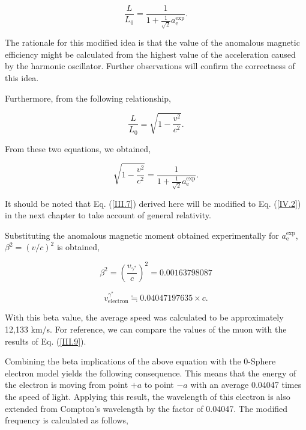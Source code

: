\documentclass[10.5pt]{article}
\numberwithin{equation}{section}
\begin{document}
    \begin{equation}
        \frac{L}{L_0} = \frac{1}{1 + \frac{1}{\sqrt{2}}a^{\text{exp}}_{\text{e}}} .
        \label{III.5}
    \end{equation}


The rationale for this modified idea is that the value of the anomalous magnetic efficiency might be calculated from the highest value of the acceleration caused by the harmonic oscillator. Further observations will confirm the correctness of this idea.

Furthermore, from the following relationship,

    \begin{equation}
        \frac{L}{L_0} = \sqrt{1 - \frac{v^2}{c^2}} .
    \end{equation}

From these two equations, we obtained,

    \begin{equation}
        \sqrt{1 - \frac{v^2}{c^2}} = \frac{1}{1 + \frac{1}{\sqrt{2}} a^{\text{exp}}_{\text{e}}}  .
        \label{III.7}
    \end{equation}


It should be noted that Eq. (\ref{III.7}) derived here will be modified to Eq. (\ref{IV.2}) in the next chapter to take account of general relativity.


Substituting the anomalous magnetic moment obtained experimentally for $a^{\text{exp}}_{\text{e}}$, $\beta^2 = (v/{c})^2$ is obtained,


    \begin{equation}
        \beta^2 = (\frac{v_{\gamma^{*}}}{c})^2 = 0.00163798087
    \end{equation}

    \begin{equation}
        v_{\text{electron}}^{\gamma^{*}} \fallingdotseq 0.04047197635 \times c .
        \label{III.9}
    \end{equation}


With this beta value, the average speed was calculated to be approximately 12,133 km/s. For reference, we can compare the values of the muon with the results of Eq. (\ref{III.9}). 

Combining the beta implications of the above equation with the 0-Sphere electron model yields the following consequence. This means that the energy of the electron is moving from point $+a$ to point $-a$ with an average 0.04047 times the speed of light. Applying this result, the wavelength of this electron is also extended from Compton's wavelength by the factor of 0.04047. The modified frequency is calculated as follows,
\end{document}
